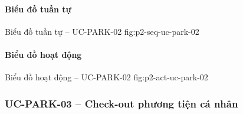 \clearpage
\paragraph{Biểu đồ tuần tự}
  {Biểu đồ tuần tự -- UC-PARK-02}
  {fig:p2-seq-uc-park-02}

\clearpage
\paragraph{Biểu đồ hoạt động}
  {Biểu đồ hoạt động -- UC-PARK-02}
  {fig:p2-act-uc-park-02}

\clearpage

\subsubsection{UC-PARK-03 -- Check-out phương tiện cá nhân}


